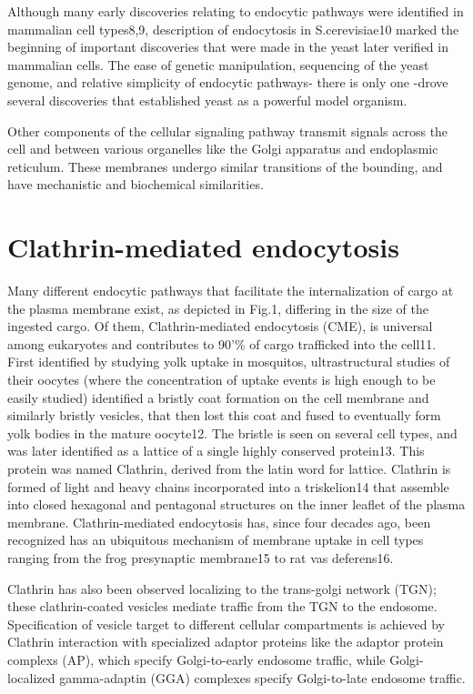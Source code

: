 \vspace{5mm}
Although many early discoveries relating to endocytic pathways were identified in mammalian cell types8,9, description of endocytosis in S.cerevisiae10 marked the beginning of important discoveries that were made in the yeast later verified in mammalian cells. The ease of genetic manipulation, sequencing of the yeast genome, and relative simplicity of endocytic pathways- there is only one -drove several discoveries that established yeast as a powerful model organism.

\vspace{5mm}
Other components of the cellular signaling pathway transmit signals across the cell and between various organelles like the Golgi apparatus and endoplasmic reticulum. These membranes undergo similar transitions of the bounding, and have mechanistic and biochemical similarities. 



\section{Clathrin-mediated endocytosis}
Many different endocytic pathways that facilitate the internalization of cargo at the plasma membrane exist, as depicted in Fig.1, differing in the size of the ingested cargo. Of them, Clathrin-mediated endocytosis (CME), is universal among eukaryotes and contributes to 90'\% of cargo trafficked into the cell11. First identified by studying yolk uptake in mosquitos, ultrastructural studies of their oocytes (where the concentration of uptake events is high enough to be easily studied) identified a bristly coat formation on the cell membrane and similarly bristly vesicles, that then lost this coat and fused to eventually form yolk bodies in the mature oocyte12. The bristle is seen on several cell types, and was later identified as a lattice of a single highly conserved protein13. This protein was named Clathrin, derived from the latin word for lattice. Clathrin is formed of light and heavy chains incorporated into a triskelion14 that assemble into closed hexagonal and pentagonal structures on the inner leaflet of the plasma membrane. Clathrin-mediated endocytosis has, since four decades ago, been recognized has an ubiquitous mechanism of membrane uptake in cell types ranging from the frog presynaptic membrane15 to rat vas deferens16. 

\vspace{5mm}
Clathrin has also been observed localizing to the trans-golgi network (TGN); these clathrin-coated vesicles mediate traffic from the TGN to the endosome. Specification of vesicle target to different cellular compartments is achieved by Clathrin interaction with specialized adaptor proteins like the adaptor protein complexs (AP), which specify Golgi-to-early endosome traffic, while Golgi-localized gamma-adaptin (GGA) complexes specify Golgi-to-late endosome traffic. 


